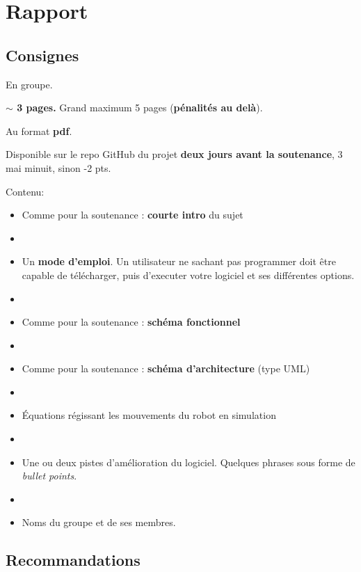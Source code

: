 \documentclass[a4paper,12pt]{article}
\begin{document}
\section{Rapport}

\subsection{Consignes}

En groupe.

\vspace{0.2cm}

\textbf{$\sim$ 3 pages.} Grand maximum 5 pages (\textbf{pénalités au delà}). 

\vspace{0.2cm}

Au format \textbf{pdf}.

\vspace{0.2cm}

Disponible sur le repo GitHub du projet \textbf{deux jours avant la soutenance}, 3 mai minuit, sinon -2 pts.

\vspace{0.2cm}

Contenu:
\begin{itemize}
\item[$\ast$] Comme pour la soutenance : \textbf{courte intro} du sujet 
\item[$ $]
\item[$\ast$] Un \textbf{mode d'emploi}. Un utilisateur ne sachant pas programmer doit
être capable de télécharger, puis d'executer votre logiciel et ses différentes options.
\item[$ $]
\item[$\ast$] Comme pour la soutenance : \textbf{schéma fonctionnel}
\item[$ $]
\item[$\ast$] Comme pour la soutenance : \textbf{schéma d'architecture} (type UML)
\item[$ $]
\item[$\ast$] Équations régissant les mouvements du robot en simulation
\item[$ $]
\item[$\ast$] Une ou deux pistes d'amélioration du logiciel. Quelques phrases sous forme de 
\textit{bullet points}.
\item[$ $]
\item[$\ast$] Noms du groupe et de ses membres.
\end{itemize}


\subsection{Recommandations}
\end{document}
